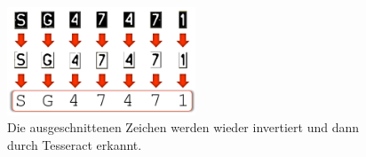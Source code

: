 \begin{figure}
    \centering
    \includegraphics[width=0.5\textwidth]{abbildungen/character_preprocessing}
    \caption[Vorverarbeitung der einzelnen Zeichen]{Die ausgeschnittenen
        Zeichen werden wieder invertiert und dann durch
        Tesseract erkannt.}
    \label{fig:character-preprocessing}
\end{figure}